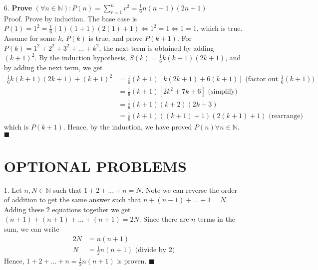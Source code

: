 \documentclass[11pt]{exam}
\begin{document}
\begin{enumerate}[leftmargin=0pt]
\item[6.] \textbf{Prove} $(\forall n \in \mathbb{N}) : P(n) = \sum_{r = 1}^n r^2 = \frac{1}{6}n(n + 1)(2n + 1)$ \\
Proof. Prove by induction. The base case is $P(1) = 1^2 = \frac{1}{6}(1)(1 + 1)(2(1) + 1) \Leftrightarrow 1^2 = 1 \Leftrightarrow 1 = 1$, which is true. Assume for some $k$, $P(k)$ is true, and prove $P(k + 1)$. For $P(k) = 1^2 + 2^2 + 3^2 +...+ k^2$, the next term is obtained by adding $(k + 1)^2$. By the induction hypothesis, $S(k) = \frac{1}{6}k(k + 1)(2k + 1)$, and by adding the next term, we get
\begin{align*}
    \frac{1}{6}k(k + 1)(2k + 1) + (k + 1)^2 &= \frac{1}{6}(k + 1)[k(2k + 1) + 6(k + 1)] \text{ (factor out $\frac{1}{6}(k + 1)$)} \\
    &= \frac{1}{6}(k + 1)[2k^2 + 7k + 6] \text{ (simplify)} \\
    &= \frac{1}{6}(k + 1)(k + 2)(2k + 3) \\
    &= \frac{1}{6}(k + 1)((k + 1) + 1)(2(k + 1) + 1) \text{ (rearrange)}
\end{align*}
which is $P(k + 1)$. Hence, by the induction, we have proved $P(n) \forall n \in \mathbb{N}$. $\blacksquare$

\section{OPTIONAL PROBLEMS}

\item[1.] Let $n, N \in \mathbb{N}$ such that $1 + 2 +...+ n = N$. Note we can reverse the order of addition to get the same answer such that $n + (n - 1) +...+ 1 = N$. Adding these 2 equations together we get $(n + 1) + (n + 1) +...+ (n + 1) = 2N$. Since there are $n$ terms in the sum, we can write
\begin{align*}
    2N &= n(n + 1) \\
    N &= \frac{1}{2}n(n + 1) \text{ (divide by 2)}
\end{align*}
Hence, $1 + 2 +...+ n = \frac{1}{2}n(n + 1)$ is proven. $\blacksquare$


\end{enumerate}
\end{document}
